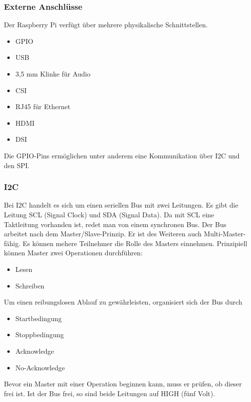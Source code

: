 \cite{richter}

\subsubsection{Externe Anschlüsse}
Der Raspberry Pi verfügt über mehrere physikalische Schnittstellen. 
\begin{itemize}
\item \ac{GPIO}
\item USB
\item 3,5 mm Klinke für Audio
\item \ac{CSI}
\item RJ45 für Ethernet
\item HDMI
\item \ac{DSI}
\end{itemize}

Die \ac{GPIO}-Pins ermöglichen unter anderem eine Kommunikation über \ac{I2C} und den \ac{SPI}. 

\subsubsection{\ac{I2C}} Bei \ac{I2C} handelt es sich um einen seriellen Bus mit zwei Leitungen. Es gibt die Leitung SCL (Signal Clock) und SDA (Signal Data). Da mit SCL eine Taktleitung vorhanden ist, redet man von einem synchronen Bus. Der Bus arbeitet nach dem Master/Slave-Prinzip. Er ist des Weiteren auch Multi-Master-fähig. Es können mehere Teilnehmer die Rolle des Masters einnehmen. Prinzipiell können Master zwei Operationen durchführen: 
\begin{itemize}
\item Lesen
\item Schreiben
\end{itemize} 
Um einen reibungslosen Ablauf zu gewährleisten, organisiert sich der Bus durch
\begin{itemize}
\item Startbedingung
\item Stoppbedingung
\item Acknowledge
\item No-Acknowledge
\end{itemize}
Bevor ein Master mit einer Operation beginnen kann, muss er prüfen, ob dieser frei ist. Ist der Bus frei, so sind beide Leitungen auf HIGH (fünf Volt). 


